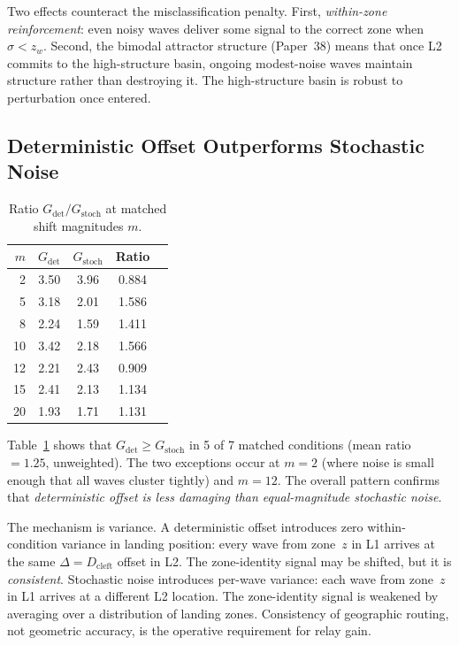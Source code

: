 \documentclass[11pt]{article}
\begin{document}
Two effects counteract the misclassification penalty.
First, \emph{within-zone reinforcement}: even noisy waves deliver some
signal to the correct zone when $\sigma < z_w$.
Second, the bimodal attractor structure (Paper~38) means that once L2
commits to the high-structure basin, ongoing modest-noise waves
maintain structure rather than destroying it.
The high-structure basin is robust to perturbation once entered.

\subsection{Deterministic Offset Outperforms Stochastic Noise}

\begin{table}[h]
  \centering
  \caption{Ratio $G_\mathrm{det}/G_\mathrm{stoch}$ at matched shift
           magnitudes $m$.}
  \label{tab:ratio}
  \small
  \begin{tabular}{rcccc}
    \toprule
    $m$ & $G_\mathrm{det}$ & $G_\mathrm{stoch}$ & Ratio \\
    \midrule
     2  & 3.50 & 3.96 & 0.884 \\
     5  & 3.18 & 2.01 & 1.586 \\
     8  & 2.24 & 1.59 & 1.411 \\
    10  & 3.42 & 2.18 & 1.566 \\
    12  & 2.21 & 2.43 & 0.909 \\
    15  & 2.41 & 2.13 & 1.134 \\
    20  & 1.93 & 1.71 & 1.131 \\
    \bottomrule
  \end{tabular}
\end{table}

Table~\ref{tab:ratio} shows that $G_\mathrm{det} \ge G_\mathrm{stoch}$
in 5 of 7 matched conditions (mean ratio $= 1.25$, unweighted).
The two exceptions occur at $m = 2$ (where noise is small enough that
all waves cluster tightly) and $m = 12$.
The overall pattern confirms that \emph{deterministic offset is less
damaging than equal-magnitude stochastic noise}.

The mechanism is variance.
A deterministic offset introduces zero within-condition variance in
landing position: every wave from zone~$z$ in L1 arrives at the same
$\Delta = D_\mathrm{cleft}$ offset in L2.
The zone-identity signal may be shifted, but it is \emph{consistent}.
Stochastic noise introduces per-wave variance: each wave from zone~$z$
in L1 arrives at a different L2 location.
The zone-identity signal is weakened by averaging over a distribution
of landing zones.
Consistency of geographic routing, not geometric accuracy, is the
operative requirement for relay gain.
\end{document}
